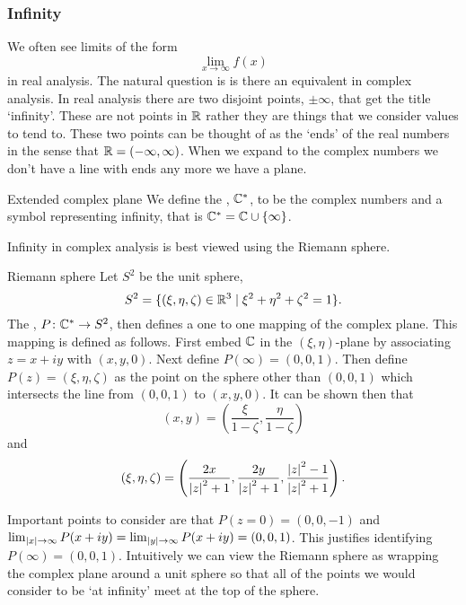 \documentclass{article}
\newcommand{\st}{\mid}
\newcommand{\union}{\cup}
\begin{document}
    \subsubsection{Infinity}
    We often see limits of the form
    \[\lim_{x\to\infty} f(x)\]
    in real analysis.
    The natural question is is there an equivalent in complex analysis.
    In real analysis there are two disjoint points, \(\pm\infty\), that get the title `infinity'.
    These are not points in \(\mathbb{R}\) rather they are things that we consider values to tend to.
    These two points can be thought of as the `ends' of the real numbers in the sense that \(\mathbb{R} = (-\infty, \infty)\).
    When we expand to the complex numbers we don't have a line with ends any more we have a plane.
    \begin{definition}{Extended complex plane}{}
        We define the , \(\mathbb{C}^*\), to be the complex numbers and a symbol representing infinity, that is \(\complex^* = \complex\union\{\infty\}\).
    \end{definition}
    Infinity in complex analysis is best viewed using the Riemann sphere.
    \begin{definition}{Riemann sphere}{}
        Let \(S^2\) be the unit sphere,
        \[S^2 = \{(\xi, \eta, \zeta)\in\reals^3\st \xi^2 + \eta^2 + \zeta^2 = 1\}.\]
        The , \(P\colon \mathbb{C}^*\to S^2\), then defines a one to one mapping of the complex plane.
        This mapping is defined as follows.
        First embed \(\mathbb{C}\) in the \((\xi, \eta)\)-plane by associating \(z = x + iy\) with \((x, y, 0)\).
        Next define \(P(\infty) = (0, 0, 1)\).
        Then define \(P(z) = (\xi, \eta, \zeta)\) as the point on the sphere other than \((0, 0, 1)\) which intersects the line from \((0, 0, 1)\) to \((x, y, 0)\).
        It can be shown then that
        \[(x, y) = \left(\frac{\xi}{1 - \zeta}, \frac{\eta}{1 - \zeta}\right)\]
        and
        \[(\xi, \eta, \zeta) = \left(\frac{2x}{\abs{z}^2 + 1}, \frac{2y}{\abs{z}^2 + 1}, \frac{\abs{z}^2 - 1}{\abs{z}^2 + 1}\right).\]
    \end{definition}
    Important points to consider are that \(P(z = 0) = (0, 0, -1)\) and \(\lim_{\abs{x}\to\infty} P(x + iy) = \lim_{\abs{y}\to\infty} P(x + iy) = (0, 0, 1)\).
    This justifies identifying \(P(\infty) = (0, 0, 1)\).
    Intuitively we can view the Riemann sphere as wrapping the complex plane around a unit sphere so that all of the points we would consider to be `at infinity' meet at the top of the sphere.
    
\end{document}
